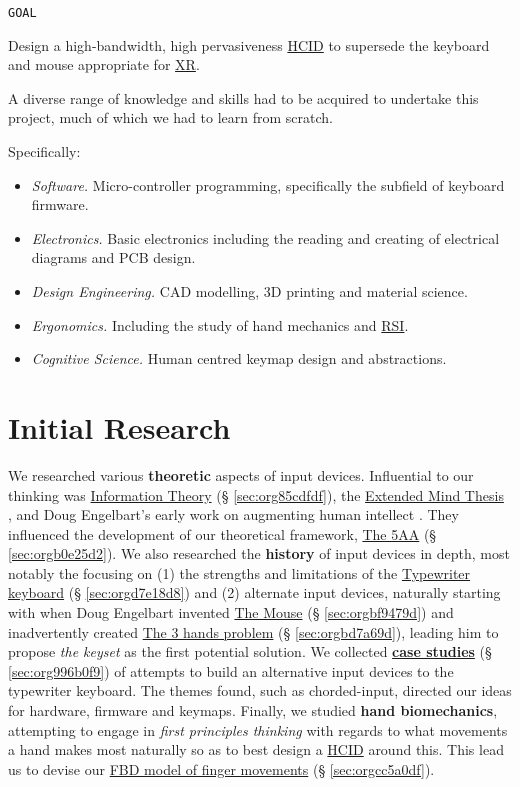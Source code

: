 \documentclass[logo,bsc,singlespacing,parskip]{infthesis}
\begin{document}
\begin{mdframed}
\begin{description}
\item[{\texttt{GOAL}}] 
\end{description}

Design a high-bandwidth, high pervasiveness \hyperref[org30e2275]{HCID} to supersede the keyboard and mouse appropriate for \hyperref[orgf7f8e78]{XR}.
\end{mdframed}

A diverse range of knowledge and skills had to be acquired to undertake this project, much of which we had to learn from scratch.

Specifically:
\begin{itemize}
\item \emph{Software.} Micro-controller programming, specifically the subfield of keyboard firmware.
\item \emph{Electronics.} Basic electronics including the reading and creating of electrical diagrams and PCB design.
\item \emph{Design Engineering.} CAD modelling, 3D printing and material science.
\item \emph{Ergonomics.} Including the study of hand mechanics and \hyperref[orgc186d45]{RSI}.
\item \emph{Cognitive Science.} Human centred keymap design and abstractions.
\end{itemize}
\chapter{Initial Research}
\label{sec:org3361615}
We researched various \textbf{theoretic} aspects of input devices.
Influential to our thinking was \hyperref[sec:org85cdfdf]{Information Theory} (§ \ref{sec:org85cdfdf}), the \hyperref[extended mind thesis]{Extended Mind Thesis} \autocite{ExtendedMindAndy}, and Doug Engelbart's early work on augmenting human intellect \autocite{engelbartAugmentingHumanIntellect1962}.
They influenced the development of our theoretical framework, \hyperref[sec:orgb0e25d2]{The 5AA} (§ \ref{sec:orgb0e25d2}).
We also researched the \textbf{history} of input devices in depth, most notably the focusing on (1) the strengths and limitations of the \hyperref[sec:orgd7e18d8]{Typewriter keyboard} (§ \ref{sec:orgd7e18d8}) and (2) alternate input devices, naturally starting with when Doug Engelbart invented \hyperref[sec:orgbf9479d]{The Mouse} (§ \ref{sec:orgbf9479d}) and inadvertently created \hyperref[sec:orgbd7a69d]{The 3 hands problem} (§ \ref{sec:orgbd7a69d}), leading him to propose \emph{the keyset} as the first potential solution.
We collected \hyperref[sec:org996b0f9]{\textbf{case studies}} (§ \ref{sec:org996b0f9}) of attempts to build an alternative input devices to the typewriter keyboard.
The themes found, such as chorded-input, directed our ideas for hardware, firmware and keymaps.
Finally, we studied \textbf{hand biomechanics}, attempting to engage in \emph{first principles thinking} with regards to what movements a hand makes most naturally so as to best design a \hyperref[org30e2275]{HCID} around this.
This lead us to devise our \hyperref[sec:orgcc5a0df]{FBD model of finger movements} (§ \ref{sec:orgcc5a0df}).
\end{document}
